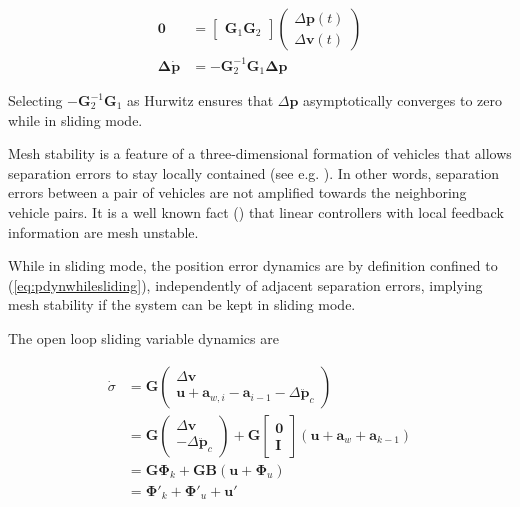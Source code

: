\documentclass{ifacconf}
\providecommand{\mbf}[1]{\mathbf{#1}}
\begin{document}
\begin{align}
\mbf{0}
&=
\begin{bmatrix}
\mbf{G}_1 \mbf{G}_2
\end{bmatrix}
\begin{pmatrix}
\Delta \mbf{p}(t)\\
\Delta \mbf{v}(t)
\end{pmatrix} \\
\mbf{\Delta} \dot{\mbf{p}}
&= - \mbf{G}_2^{-1} \mbf{G}_1 \mbf{\Delta} \mbf{p}
\label{eq:pdynwhilesliding}
\end{align}

Selecting $- \mbf{G}_2^{-1} \mbf{G}_1$ as Hurwitz ensures that $\Delta \mbf{p}$ asymptotically converges to zero while in sliding mode.

Mesh stability is a feature of a three-dimensional formation of vehicles that allows separation errors to stay locally contained (see e.g. \cite{Pant2002}). In other words, separation errors between a pair of vehicles are not amplified towards the neighboring vehicle pairs. It is a well known fact (\cite{Pant2002}) that linear controllers with local feedback information are mesh unstable.

While in sliding mode, the position error dynamics are by definition confined to (\ref{eq:pdynwhilesliding}), independently of adjacent separation errors, implying mesh stability if the system can be kept in sliding mode.

The open loop sliding variable dynamics are

\begin{align}
\dot{{\sigma}} &= \mbf{G}
\begin{pmatrix}
\Delta \mbf{v} \\
\mbf{u} + \mbf{a}_{w,i}
 - \mbf{a}_{i-1} -  \Delta \ddot{\mbf{p}}_c
\end{pmatrix}\\
& = \mbf{G}
\begin{pmatrix}
\Delta \mbf{v} \\
 - \Delta \ddot{\mbf{p}}_c
\end{pmatrix} + \mbf{G}
\begin{bmatrix}
{\mbf{0}}\\
{\mbf{I}}
\end{bmatrix}
(\mbf{u} + \mbf{a}_w + \mbf{a}_{k-1}) \\
&= \mbf{G} \mbf{\Phi}_k + \mbf{G} \mbf{B}(
\mbf{u}
 + {\mbf\Phi}_u)
\label{eq:sigmadynconti}\\
&= \mbf{\Phi}'_k + \mbf{\Phi}'_u + \mbf{u}'
\label{eq:sigmadyncontishort}
\end{align}
\end{document}
